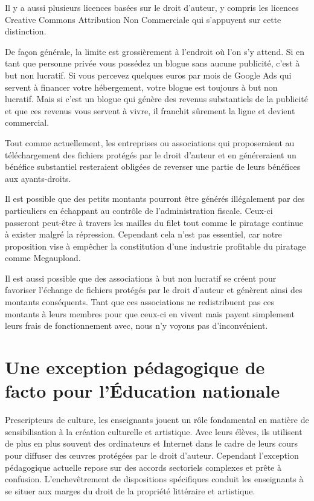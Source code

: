 Il y a aussi plusieurs licences basées sur le droit d’auteur, y compris les licences Creative Commons
Attribution Non Commerciale qui s'appuyent sur cette distinction.

De façon générale, la limite est grossièrement à
l’endroit où l'on s'y attend. Si en tant que personne privée vous possédez un blogue sans
aucune publicité, c’est à but non lucratif. Si vous percevez quelques euros par mois de Google Ads qui servent à financer votre hébergement, votre blogue est toujours à but non lucratif. Mais si c’est un blogue qui génère des revenus substantiels de la publicité et que ces revenus vous servent à vivre, il franchit sûrement la ligne et devient commercial. 

Tout comme actuellement, les entreprises ou associations qui proposeraient au téléchargement des fichiers protégés par le droit d'auteur et en généreraient un bénéfice substantiel resteraient obligées de reverser une partie de leurs bénéfices aux ayants-droits. 

Il est possible que des petits montants pourront être générés illégalement par des particuliers en échappant au contrôle de l'administration fiscale. Ceux-ci passeront peut-être à travers les mailles du filet tout comme le piratage continue à exister malgré la répression. Cependant cela n'est pas essentiel, car notre proposition vise à empêcher la constitution d'une industrie profitable du piratage comme Megaupload.

Il est aussi possible que des associations à but non lucratif se créent pour favoriser l'échange de fichiers protégés par le droit d'auteur et génèrent ainsi des montants conséquents. Tant que ces associations ne redistribuent pas ces montants à leurs membres pour que ceux-ci en vivent mais payent simplement leurs frais de fonctionnement avec, nous n'y voyons pas d'inconvénient. 

\section{Une exception pédagogique de facto pour l'Éducation nationale}

Prescripteurs de culture, les enseignants jouent un rôle fondamental en matière de sensibilisation à la création
culturelle et artistique. Avec leurs élèves, ils utilisent de plus en plus souvent des ordinateurs et Internet dans le cadre de leurs cours pour diffuser des œuvres protégées par le droit d'auteur. Cependant l'exception pédagogique actuelle repose sur des accords sectoriels complexes et prête à confusion. L’enchevêtrement de dispositions spécifiques conduit les enseignants à se situer aux marges du droit de la propriété littéraire et artistique.


